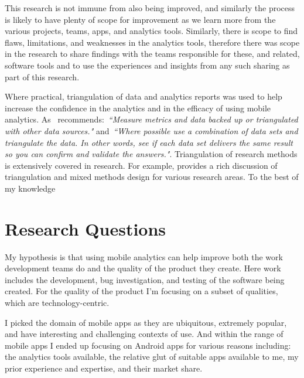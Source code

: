 This research is not immune from also being improved, and similarly the process is likely to have plenty of scope for improvement as we learn more from the various projects, teams, apps, and analytics tools. Similarly, there is scope to find flaws, limitations, and weaknesses in the analytics tools, therefore there was scope in the research to share findings with the teams responsible for these, and related, software tools and to use the experiences and insights from any such sharing as part of this research.

Where practical, triangulation of data and analytics reports was used to help increase the confidence in the analytics and in the efficacy of using mobile analytics. As~\citep{marr2015bigdatabook} recommends:~\emph{``Measure metrics and data backed up or triangulated with other data sources."} and~\emph{``Where possible use a combination of data sets and triangulate the data. In other words, see if each data set delivers the same result so you can confirm and validate the answers."}. Triangulation of research methods is extensively covered in research. For example, \citep{fielding2012_triangulation_and_mixed_methods_designs} provides a rich discussion of triangulation and mixed methods design for various research areas. To the best of my knowledge  %


\section{Research Questions}
\label{section-research-questions}

My hypothesis is that using mobile analytics can help improve both the work development teams do and the quality of the product they create. Here work includes the development, bug investigation, and testing of the software being created. For the quality of the product I'm focusing on a subset of qualities, which are technology-centric.

I picked the domain of mobile apps as they are ubiquitous, extremely popular, and have interesting and challenging contexts of use. And within the range of mobile apps I ended up focusing on Android apps for various reasons including: the analytics tools available, the relative glut of suitable apps available to me, my prior experience and expertise, and their market share.


